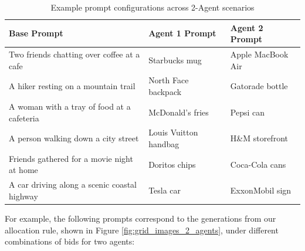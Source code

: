 \documentclass[format=acmsmall, review=false]{acmart}
\begin{document}
\begin{table}[H]
\captionsetup{skip=2pt}
\caption{Example prompt configurations across 2-Agent scenarios}
\centering
\footnotesize
\begin{tabular}{>{\raggedright\arraybackslash}p{6cm} 
                >{\raggedright\arraybackslash}p{3cm} 
                >{\raggedright\arraybackslash}p{3cm}}
\toprule
\textbf{Base Prompt} & \textbf{Agent 1 Prompt} & \textbf{Agent 2 Prompt} \\
\midrule
Two friends chatting over coffee at a cafe & Starbucks mug & Apple MacBook Air \\ \hline
A hiker resting on a mountain trail & North Face backpack & Gatorade bottle \\ \hline
A woman with a tray of food at a cafeteria & McDonald's fries & Pepsi can \\ \hline
A person walking down a city street & Louis Vuitton handbag & H\&M storefront \\ \hline
Friends gathered for a movie night at home & Doritos chips & Coca-Cola cans \\ \hline
A car driving along a scenic coastal highway & Tesla car & ExxonMobil sign \\
\bottomrule
\end{tabular}
\label{tab:prompts_2_agents}
\end{table}


For example, the following prompts correspond to the generations from our allocation rule, shown in Figure \ref{fig:grid_images_2_agents}, under different combinations of bids for two agents:
\end{document}
